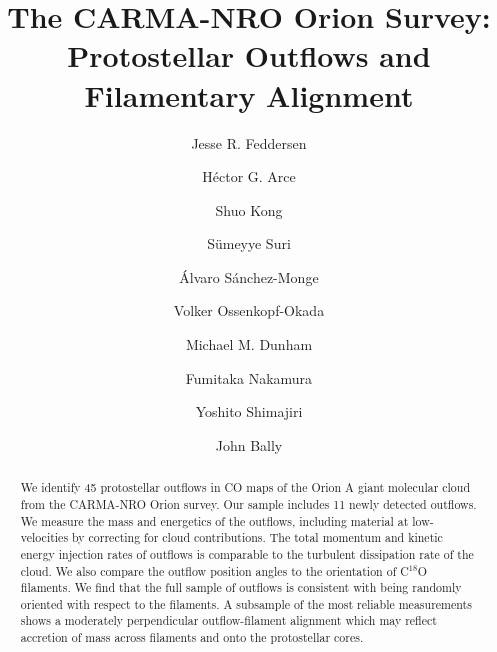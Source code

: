 \documentclass[twocolumn]{aastex63}
\newcommand{\numnew}{11}
\begin{document}
\title{The CARMA-NRO Orion Survey: Protostellar Outflows and Filamentary Alignment}

\author{Jesse R. Feddersen}
\author{H\'ector G. Arce}
\author{Shuo Kong}
\author{S\"umeyye Suri}
\author{\'Alvaro S\'anchez-Monge}
\author{Volker Ossenkopf-Okada}
\author{Michael M. Dunham}
\author{Fumitaka Nakamura}
\author{Yoshito Shimajiri}
\author{John Bally}

\begin{abstract}
We identify 45 protostellar outflows in CO maps of the Orion A giant molecular cloud from the CARMA-NRO Orion survey. Our sample includes \numnew{} newly detected outflows. We measure the mass and energetics of the outflows, including material at low-velocities by correcting for cloud contributions. The total momentum and kinetic energy injection rates of outflows is comparable to the turbulent dissipation rate of the cloud. We also compare the outflow position angles to the orientation of C$^{18}$O filaments. We find that the full sample of outflows is consistent with being randomly oriented with respect to the filaments. A subsample of the most reliable measurements shows a moderately perpendicular outflow-filament alignment which may reflect accretion of mass across filaments and onto the protostellar cores.
\end{abstract}

\end{document}
